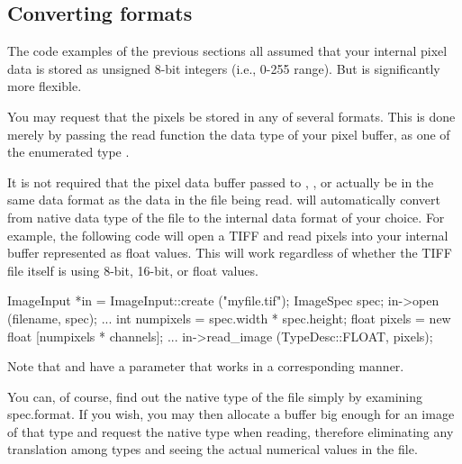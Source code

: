 \subsection{Converting formats}
\label{sec:imageinput:convertingformat}

The code examples of the previous sections all assumed that your
internal pixel data is stored as unsigned 8-bit integers (i.e., 0-255
range).  But \product is significantly more flexible.  

You may request that the pixels be stored in any of several formats.
This is done merely by passing the {\cf read} function the data type
of your pixel buffer, as one of the enumerated type \TypeDesc.


It is not required that the pixel data buffer passed to \readimage,
\readscanline, or \readtile actually be in the same data format as the
data in the file being read.  \product will automatically convert from
native data type of the file to the internal data format of your choice.
For example, the following code will open a TIFF and read pixels into
your internal buffer represented as {\cf float} values.  This will work
regardless of whether the TIFF file itself is using 8-bit, 16-bit, or
float values.

\begin{code}
        ImageInput *in = ImageInput::create ("myfile.tif");
        ImageSpec spec;
        in->open (filename, spec);
        ...
        int numpixels = spec.width * spec.height;
        float pixels = new float [numpixels * channels];
        ...
        in->read_image (TypeDesc::FLOAT, pixels);
\end{code}

\noindent Note that \readscanline and \readtile have a parameter that
works in a corresponding manner.

You can, of course, find out the native type of the file simply by
examining {\cf spec.format}.  If you wish, you may then allocate a
buffer big enough for an image of that type and request the native type
when reading, therefore eliminating any translation among types and
seeing the actual numerical values in the file.

